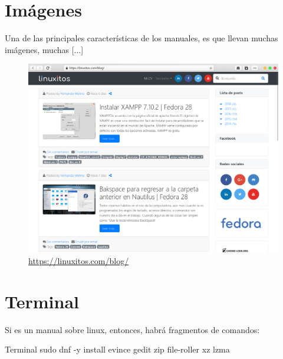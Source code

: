 \section{Imágenes}
Una de las principales características de los manuales, es que llevan muchas imágenes, muchas [...]

\begin{figure}[!htb]
	\centering
	\includegraphics[width=1\textwidth]{img/4.png}
	\caption{\url{https://linuxitos.com/blog/}}
	\label{img:4}
\end{figure}

\section{Terminal}
Si es un manual sobre linux, entonces, habrá fragmentos de comandos:

\begin{myminted}{Terminal}
	sudo dnf -y install evince gedit zip file-roller xz lzma
\end{myminted}




